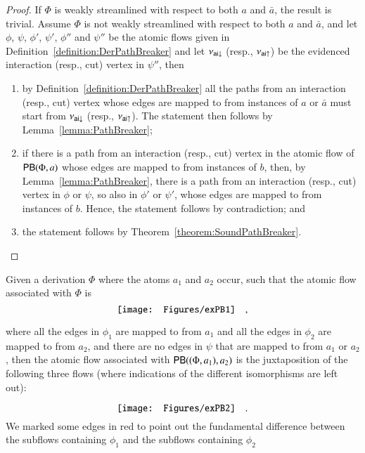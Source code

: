 \begin{proof}
If $\Phi$ is weakly streamlined with respect to both $a$ and $\bar a$, the result is trivial. Assume $\Phi$ is not weakly streamlined with respect to both $a$ and $\bar a$, and let $\phi$, $\psi$, $\phi'$, $\psi'$, $\phi''$ and $\psi''$ be the atomic flows given in Definition~\ref{definition:DerPathBreaker} and let $\nu_{{\mathsf{ai}}{\downarrow}}$ (resp., $\nu_{{\mathsf{ai}}{\uparrow}}$) be the evidenced interaction (resp., cut) vertex in $\psi''$, then
\begin{enumerate}
\item by Definition~\ref{definition:DerPathBreaker} all the paths from an interaction (resp., cut) vertex whose edges are mapped to from instances of $a$ or $\bar a$ must start from $\nu_{{\mathsf{ai}}{\downarrow}}$ (resp., $\nu_{{\mathsf{ai}}{\uparrow}}$). The statement then follows by Lemma~\vref{lemma:PathBreaker};
\item if there is a path from an interaction (resp., cut) vertex in the atomic flow of $\mathsf{PB}(\Phi,a)$ whose edges are mapped to from instances of $b$, then, by Lemma~\ref{lemma:PathBreaker}, there is a path from an interaction (resp., cut) vertex in $\phi$ or $\psi$, so also in $\phi'$ or $\psi'$, whose edges are mapped to from instances of $b$. Hence, the statement follows by contradiction; and
\item the statement follows by Theorem~\vref{theorem:SoundPathBreaker}.
\end{enumerate}
\end{proof}

\begin{example}\label{example:PathBreaker}
Given a derivation $\Phi$ where the atoms $a_1$ and $a_2$ occur, such that the atomic flow associated with $\Phi$ is
\[
\vcenter{\hbox{\texttt{[image: Figures/exPB1]}}}
\quad,
\]


where all the edges in $\phi_1$ are mapped to from $a_1$ and all the edges in $\phi_2$ are mapped to from $a_2$, and there are no edges in $\psi$ that are mapped to from $a_1$ or $a_2$, then the atomic flow associated with $\mathsf{PB}((\Phi,a_1),a_2)$ is the juxtaposition of the following three flows (where indications of the different isomorphisms are left out):




\[
\vcenter{\hbox{\texttt{[image: Figures/exPB2]}}}
\quad.
\]
We marked some edges in red to point out the fundamental difference between the subflows containing $\phi_1$ and the subflows containing $\phi_2$
\end{example}
